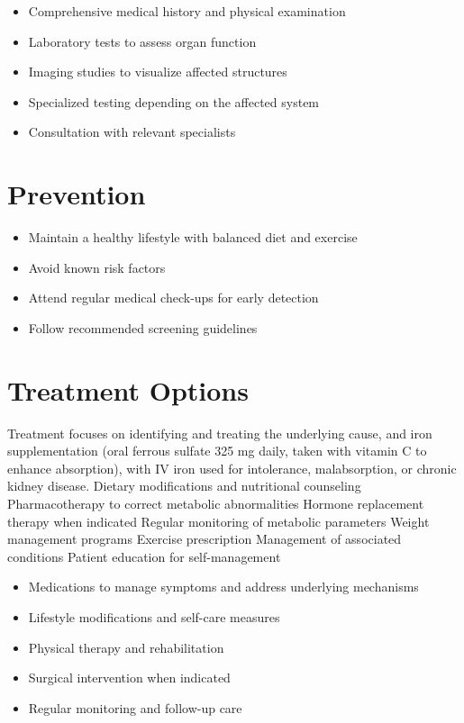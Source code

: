 \begin{itemize}[noitemsep]
  \item Comprehensive medical history and physical examination
  \item Laboratory tests to assess organ function
  \item Imaging studies to visualize affected structures
  \item Specialized testing depending on the affected system
  \item Consultation with relevant specialists
\end{itemize}
\section{Prevention}
\begin{itemize}[noitemsep]
  \item Maintain a healthy lifestyle with balanced diet and exercise
  \item Avoid known risk factors
  \item Attend regular medical check-ups for early detection
  \item Follow recommended screening guidelines
\end{itemize}
\section{Treatment Options}
Treatment focuses on identifying and treating the underlying cause, and iron supplementation (oral ferrous sulfate 325 mg daily, taken with vitamin C to enhance absorption), with IV iron used for intolerance, malabsorption, or chronic kidney disease. Dietary modifications and nutritional counseling Pharmacotherapy to correct metabolic abnormalities Hormone replacement therapy when indicated Regular monitoring of metabolic parameters Weight management programs Exercise prescription Management of associated conditions Patient education for self-management

\begin{itemize}[noitemsep]
  \item Medications to manage symptoms and address underlying mechanisms
  \item Lifestyle modifications and self-care measures
  \item Physical therapy and rehabilitation
  \item Surgical intervention when indicated
  \item Regular monitoring and follow-up care
\end{itemize}
